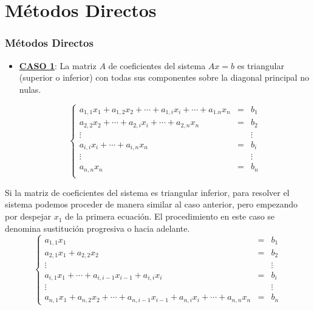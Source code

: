 \documentclass{beamer}
\begin{document}
\section{M\'etodos Directos}
\begin{frame}
  \frametitle{M\'etodos Directos}
  \begin{itemize}
    \item \underline{\textbf{CASO 1}}: La matriz $A$ de coeficientes del sistema $Ax = b$ es triangular (superior o inferior) con
    todas sus componentes sobre la diagonal principal no nulas.
    
    $$
    \left\{\begin{array}{rcc}
            a_{1,1}x_1 + a_{1,2}x_2 + \cdots + a_{1,i}x_i + \cdots + a_{1.n}x_n & = & b_1\\
             a_{2,2}x_2 + \cdots + a_{2,i}x_i + \cdots + a_{2,n}x_n & = & b_2\\
              \vdots & & \vdots\\
                 a_{i,i}x_i + \cdots + a_{i,n}x_n & = & b_i\\
                        \vdots & & \vdots\\
                     a_{n,n}x_n & = & b_n\\
           \end{array}\right.
    $$
  \end{itemize}
\end{frame}
\begin{frame}
  Si la matriz de coeficientes del sistema es triangular inferior, para resolver el sistema podemos proceder de manera similar al caso anterior, pero empezando por despejar $x_1$ de la primera ecuaci\'on. El procedimiento en este caso se denomina sustituci\'on progresiva o hacia adelante.
  $$
    \left\{\begin{array}{lcc}
            a_{1,1}x_1  & = & b_1\\
            a_{2,1}x_1 + a_{2,2}x_2 & = & b_2\\
              \vdots & & \vdots\\
            a_{i,1}x_1 + \cdots + a_{i,i-1}x_{i-1} + a_{i,i}x_i  & = & b_i\\
            \vdots & & \vdots\\
            a_{n,1}x_{1} + a_{n,2}x_2 + \cdots + a_{n,i-1}x_{i-1} + a_{n,i}x_i + \cdots + a_{n,n}x_n & = & b_{n}
           \end{array}\right.
    $$
\end{frame}
\end{document}
